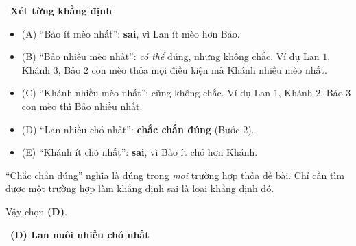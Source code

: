 \documentclass[11pt]{article}
\providecommand{\AnsWord}{Đáp số}
\newcommand{\ans}[1]{\par\smallskip{\bfseries\color{tmGreen!88!black}\AnsWord:}\ {\bfseries\color{AnsRed}#1}\par}
\newcommand{\step}[2]{\par\smallskip\noindent{\bfseries\color{tmBlue!85!black}\StepWord~#1.}\ {\bfseries #2}\par\nopagebreak}
\def\AnsWord{Đáp số}
\def\StepWord{Bước}
\begin{document}
{\step{3}{Xét từng khẳng định}
\begin{itemize}[leftmargin=1.3em,itemsep=1pt]
\item (A) ``Bảo ít mèo nhất'': \textbf{sai}, vì Lan ít mèo hơn Bảo.
\item (B) ``Bảo nhiều mèo nhất'': \emph{có thể} đúng, nhưng không chắc. Ví dụ Lan $1$, Khánh $3$, Bảo $2$ con mèo thỏa mọi điều kiện mà Khánh nhiều mèo nhất.
\item (C) ``Khánh nhiều mèo nhất'': cũng không chắc. Ví dụ Lan $1$, Khánh $2$, Bảo $3$ con mèo thì Bảo nhiều nhất.
\item (D) ``Lan nhiều chó nhất'': \textbf{chắc chắn đúng} (Bước 2).
\item (E) ``Khánh ít chó nhất'': \textbf{sai}, vì Bảo ít chó hơn Khánh.
\end{itemize}
\begin{warnbox}``Chắc chắn đúng'' nghĩa là đúng trong \emph{mọi} trường hợp thỏa đề bài. Chỉ cần tìm được một trường hợp làm khẳng định sai là loại khẳng định đó.\end{warnbox}
Vậy chọn \textbf{(D)}.
\ans{(D) Lan nuôi nhiều chó nhất}
}
\end{document}
